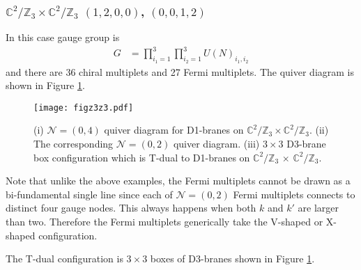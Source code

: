\documentclass{article}
\numberwithin{equation}{section}
\begin{document}
\subsubsection{$\mathbb{C}^{2}/\mathbb{Z}_{3}\times \mathbb{C}^{2}/\mathbb{Z}_{3}$ $(1,2,0,0)$, $(0,0,1,2)$}
\label{sec_z3z3}
In this case gauge group is
\begin{align}
\label{z3z3_G}
G&=\prod_{i_{1}=1}^{3}
\prod_{i_{2}=1}^{3}U(N)_{i_{1}, i_{2}}
\end{align}
and there are 36 chiral multiplets and 27 Fermi multiplets. 
The quiver diagram is shown in Figure \ref{figz3z3}. 
\begin{figure}
\begin{center}
\texttt{[image: figz3z3.pdf]}
\caption{
(i) $\mathcal{N}=(0,4)$ quiver diagram for D1-branes on $\mathbb{C}^{2}/\mathbb{Z}_{3}\times \mathbb{C}^{2}/\mathbb{Z}_{3}$. 
(ii) The corresponding $\mathcal{N}=(0,2)$ quiver diagram. 
(iii) $3\times 3$ D3-brane box configuration which is T-dual to D1-branes on 
$\mathbb{C}^{2}/\mathbb{Z}_{3}$ $\times$ $\mathbb{C}^{2}/\mathbb{Z}_{3}$. }
\label{figz3z3}
\end{center}
\end{figure}
Note that unlike the above examples, 
the Fermi multiplets cannot be drawn as a bi-fundamental single line 
since each of $\mathcal{N}=(0,2)$ Fermi multiplets connects to distinct four gauge nodes. 
This always happens when both $k$ and $k'$ are larger than two. 
Therefore the Fermi multiplets generically take the V-shaped or X-shaped configuration. 


The T-dual configuration is $3\times 3$ boxes of D3-branes shown in Figure \ref{figz3z3}. 
\end{document}
